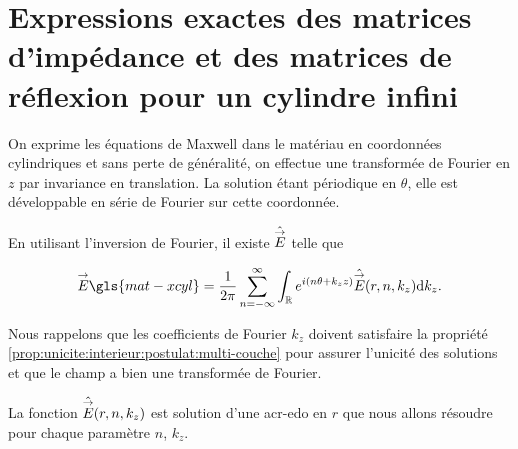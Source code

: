 \section[Opérateur de Calderón pour un cylindre infini]{Expressions exactes des matrices d'impédance et des matrices de réflexion pour un cylindre infini}


  \begin{figure}[!hbt]
    \centering
    \begin{tikzpicture}
      
    \end{tikzpicture}
  \end{figure}

  On exprime les équations de Maxwell dans le matériau en coordonnées cylindriques et sans perte de généralité, on effectue une transformée de Fourier en \(z\) par invariance en translation.
  La solution étant périodique en \(\theta\), elle est développable en série de Fourier sur cette coordonnée.

  En utilisant l'inversion de Fourier, il existe \(\hat\vE\) telle que

  \begin{equation*}
    \vE\gls{mat-xcyl} = \frac{1}{2\pi}\sum_{n=-\infty}^{\infty}\int_{\RR} e^{i(n \theta + k_z z )}\hat{\vE} (r,n,k_z) \dd{k_z}.
  \end{equation*}

  Nous rappelons que les coefficients de Fourier \(k_z\) doivent satisfaire la propriété \ref{prop:unicite:interieur:postulat:multi-couche} pour assurer l'unicité des solutions et que le champ a bien une transformée de Fourier.

  La fonction \(\hat{\vE} (r,n,k_z)\) est solution d'une \gls{acr-edo} en \(r\) que nous allons résoudre pour chaque paramètre \(n\), \(k_z\).


